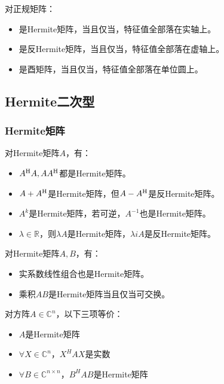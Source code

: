 \begin{theorem}
    对正规矩阵：
    \begin{itemize}
        \item 是Hermite矩阵，当且仅当，特征值全部落在实轴上。
        \item 是反Hermite矩阵，当且仅当，特征值全部落在虚轴上。
        \item 是酉矩阵，当且仅当，特征值全部落在单位圆上。
    \end{itemize}
\end{theorem}

\subsection{Hermite二次型}
\subsubsection{Hermite矩阵}

\begin{theorem}
    对Hermite矩阵$A$，有：
    \begin{itemize}
        \item $A^\mathrm{H} A,AA^\mathrm{H}$都是Hermite矩阵。
        \item $A+A^\mathrm{H}$是Hermite矩阵，但$A-A^\mathrm{H}$是反Hermite矩阵。
        \item $A^k$是Hermite矩阵，若可逆，$A^{-1}$也是Hermite矩阵。
        \item $\lambda\in \mathbb{R}$，则$\lambda A$是Hermite矩阵，$\lambda iA$是反Hermite矩阵。
    \end{itemize}
    对Hermite矩阵$A,B$，有：
    \begin{itemize}
        \item 实系数线性组合也是Hermite矩阵。
        \item 乘积$AB$是Hermite矩阵当且仅当可交换。
    \end{itemize}
\end{theorem}

\begin{theorem}
    对方阵$A\in\mathbb{C}^n$，以下三项等价：
    \begin{itemize}
        \item $A$是Hermite矩阵
        \item $\forall X\in \mathbb{C}^n$，$X^H A X$是实数
        \item $\forall B\in \mathbb{C}^{n\times n}$，$B^H A B$是Hermite矩阵
    \end{itemize}
\end{theorem}

